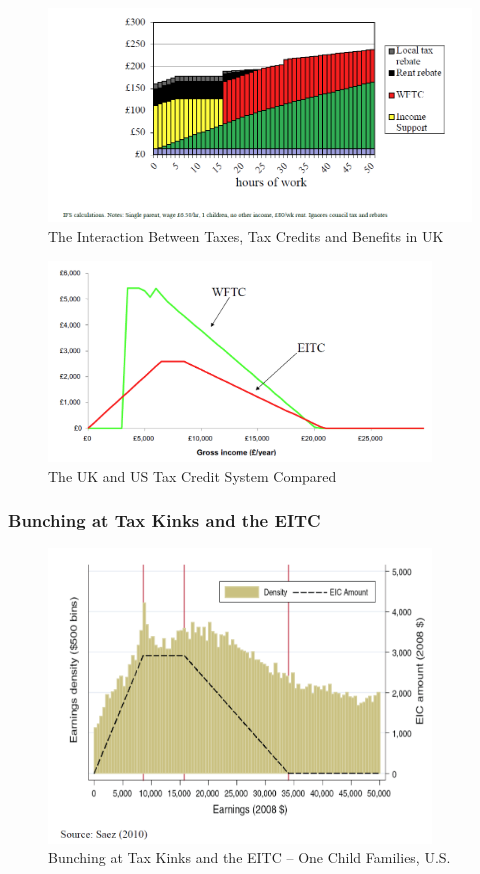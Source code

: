             \begin{figure}[H]
                \centering
                \includegraphics[width=5.5in]{images/ch13/13_UK_Tax_and_trans.png}
                \caption{The Interaction Between Taxes, Tax Credits and Benefits in UK}
            \end{figure}

            \begin{figure}[H]
                \centering
                \includegraphics[width=4in]{images/ch13/13_USUK_credit_compare.png}
                \caption{The UK and US Tax Credit System Compared}
            \end{figure}

        \subsubsection{Bunching at Tax Kinks and the EITC}

            \begin{figure}[H]
                \centering
                \includegraphics[width=4in]{images/ch13/US_Bunching_EITC_1.png}
                \caption{Bunching at Tax Kinks and the EITC -- One Child Families, U.S.}
            \end{figure}

